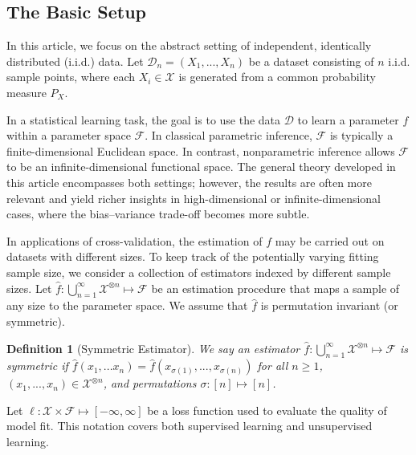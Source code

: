 \documentclass[11pt]{article}
\theoremstyle{plain}
\newtheorem{definition}[theorem]{Definition}
\newcommand{\D}{{\mathcal{D}}}
\newcommand{\X}{{\mathcal{X}}}
\begin{document}
\subsection{The Basic Setup}\label{subsec:prelim}
In this article, we focus on the abstract setting of independent, identically distributed (i.i.d.) data.
Let $\D_n=(X_1,...,X_n)$ be a dataset consisting of $n$ i.i.d. sample points, where each $X_i\in\X$ is generated from a common probability measure $P_X$.

In a statistical learning task, the goal is to use the data $\D$ to learn a parameter $f$ 
within a parameter space $\mathcal{F}$. In classical parametric inference, 
$\mathcal{F}$ is typically a finite-dimensional Euclidean space. In contrast, 
nonparametric inference allows $\mathcal{F}$ to be an infinite-dimensional functional space. 
The general theory developed in this article encompasses both settings; however, 
the results are often more relevant and yield richer insights in high-dimensional 
or infinite-dimensional cases, where the bias–variance trade-off becomes more subtle.


In applications of cross-validation, the estimation of $f$ may be carried out on datasets with different sizes. To keep track of the potentially varying fitting sample size, we consider
a collection of estimators indexed by different sample sizes. Let $\hat f:\bigcup_{n=1}^\infty \X^{\otimes n}\mapsto \mathcal F$ be an estimation procedure that maps a sample of any size to the parameter space.  We assume that $\hat f$ is permutation invariant (or symmetric).
\begin{definition}[Symmetric Estimator]\label{asm:symmetric-f}
We say an estimator $\hat f:\bigcup_{n=1}^\infty \X^{\otimes n}\mapsto \mathcal F$ is symmetric if
$\hat f(x_1,...x_n)=\hat f(x_{\sigma(1)},...,x_{\sigma(n)})$ for all $n\ge 1$, $(x_1,...,x_n)\in \X^{\otimes n}$, and permutations $\sigma:[n]\mapsto[n]$.    
\end{definition}


Let $\ell:\mathcal \X\times\mathcal F\mapsto [-\infty,\infty]$ be a loss function used to evaluate the quality of model fit.  This notation covers both supervised learning and unsupervised learning.
\end{document}
